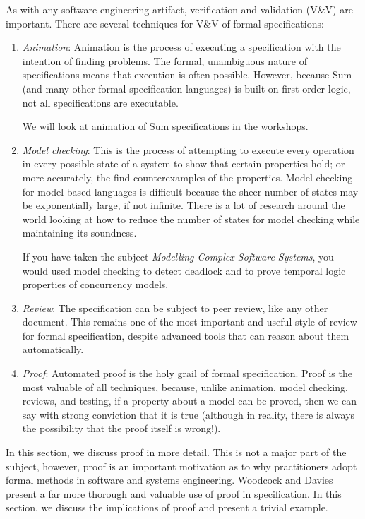 As with any software engineering artifact, verification and validation (V\&V) are important. There are several techniques for V\&V of formal specifications:

\begin{enumerate}

 \item \emph{Animation}: Animation is the process of executing a specification with the intention of finding problems. The formal, unambiguous nature of specifications means that execution is often possible. However, because Sum (and many other formal specification languages) is built on first-order logic, not all specifications are executable. 

 We will look at animation of Sum specifications in the workshops.

 \item \emph{Model checking}: This is the process of attempting to execute every operation in every possible state of a system to show that certain properties hold; or more accurately, the find counterexamples of the properties. Model checking for model-based languages is difficult because the sheer number of states may be exponentially large, if not infinite. There is a lot of research around  the world looking at how to reduce the number of states for model checking while maintaining its soundness.

  If you have taken the subject \emph{Modelling Complex Software Systems}, you would used model checking to detect deadlock and to prove temporal logic properties of concurrency models.

 \item \emph{Review}: The specification can be subject to peer review, like any other document. This remains one of the most important and useful style of review for formal specification, despite advanced tools that can reason about them automatically.

 \item \emph{Proof}: Automated proof is the holy grail of formal specification. Proof is the most valuable of all techniques, because, unlike animation, model checking, reviews, and testing, if a property about a model can be proved, then we can say with strong conviction that it is true (although in reality, there is always the possibility that the proof itself is wrong!). 

\end{enumerate}

In this section, we discuss proof in more detail. This is not a major part of the subject, however, proof is an important motivation as to why practitioners adopt formal methods in software and systems engineering. Woodcock and Davies \cite{woodcock-using-z} present a far more thorough and valuable use of proof in specification. In this section, we discuss the implications of proof and present a trivial example.


